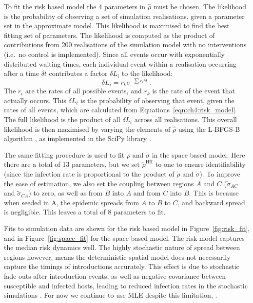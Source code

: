To fit the risk based model the 4 parameters in $\hat{\rho}$ must be chosen. The likelihood is the probability of observing a set of simulation realisations, given a parameter set in the approximate model. This likelihood is maximised to find the best fitting set of parameters. The likelihood is computed as the product of contributions from 200 realisations of the simulation model with no interventions (i.e.\ no control is implemented). Since all events occur with exponentially distributed waiting times, each individual event within a realisation occurring after a time $\delta{}t$ contributes a factor $\delta{}L_i$ to the likelihood:
\begin{equation}
\delta{}L_i = r_k\mathrm{e}^{-\sum{}r_i\delta{}t}\;.
\end{equation}
The $r_i$ are the rates of all possible events, and $r_k$ is the rate of the event that actually occurs. This $\delta{}L_i$ is the probability of observing that event, given the rates of all events, which are calculated from Equations~\ref{eqn:ch4:risk_model}. The full likelihood is the product of all $\delta{}L_i$ across all realisations. This overall likelihood is then maximised by varying the elements of $\hat{\rho}$ using the L-BFGS-B algorithm \citep{byrd_limited_1995}, as implemented in the SciPy library \citep{scipy}.

The same fitting procedure is used to fit $\tilde{\rho}$ and $\tilde{\sigma}$ in the space based model. Here there are a total of 13 parameters, but we set $\tilde{\rho}^\mathrm{HH}$ to one to ensure identifiability (since the infection rate is proportional to the product of $\tilde{\rho}$ and $\tilde{\sigma}$). To improve the ease of estimation, we also set the coupling between regions $A$ and $C$ ($\tilde{\sigma}_{AC}$ and $\tilde{\sigma}_{CA}$) to zero, as well as from $B$ into $A$ and from $C$ into $B$. This is because when seeded in A, the epidemic spreads from $A$ to $B$ to $C$, and backward spread is negligible. This leaves a total of 8 parameters to fit.

Fits to simulation data are shown for the risk based model in Figure~\ref{fig:risk_fit}, and in Figure~\ref{fig:space_fit} for the space based model. The risk model captures the median risk dynamics well. The highly stochastic nature of spread between regions however, means the deterministic spatial model does not necessarily capture the timings of introductions accurately. This effect is due to stochastic fade outs after introduction events, as well as negative covariance between susceptible and infected hosts, leading to reduced infection rates in the stochastic simulations \citep[pp.~227--229 and pp.~238--240]{keeling_modeling_2008}. For now we continue to use MLE despite this limitation, .

